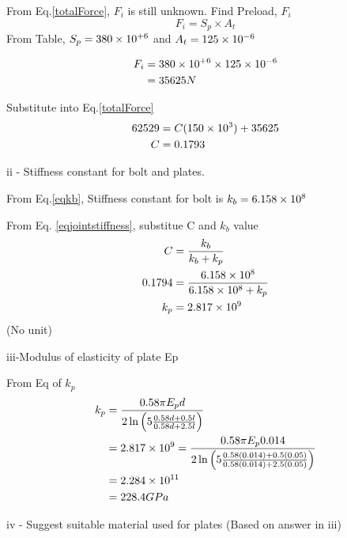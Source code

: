 \documentclass[a4paper, fleqn]{article}
\providecommand{\sci}[1]{\protect\ensuremath{\times 10^{\StrSubstitute[0]{#1}{e}{}}}}
\begin{document}
From Eq.\ref{totalForce}, $F_i$ is still unknown.
Find Preload, $F_i$
\begin{equation*}
    F_i=S_p \times A_t
\end{equation*}
From Table, $S_p=380\sci{e+6}$ and $A_t=125\sci{e-6}$

\begin{equation*}
    \begin{aligned}
    F_i&=380\sci{e+6} \times 125\sci{e-6}\\
    &=35625N 
    \end{aligned}
\end{equation*}

Substitute into Eq.\ref{totalForce}
\begin{equation*}
    \begin{aligned}
    62529 &= C(150\sci{e3})+35625 \\
    C &=0.1793
    \end{aligned}
\end{equation*}

ii - Stiffness constant for bolt and plates.


From Eq.\ref{eqkb}, Stiffness constant for bolt is $k_b=6.158\sci{e8}$

From Eq. \ref{eqjointstiffness}, substitue C and $k_b$ value
\begin{equation*}
    \begin{aligned}
    C &=\frac{k_b}{k_b+k_p}\\
    0.1794 &= \frac{6.158\sci{e8}}{6.158\sci{e8}+k_p} \\
    k_p &=2.817\sci{e9}
    \end{aligned}
\end{equation*}
(No unit)
\vspace{10pt}

iii-Modulus of elasticity of plate Ep

From Eq of $k_p$
\begin{equation}
    \begin{aligned}
        k_p &=\frac{0.58\pi E_p d}{2\ln\left( 5\frac{0.58d+0.5l}{0.58d+2.5l} \right)} \\
        &=2.817\times10^9=\frac{0.58\pi E_p 0.014}{2\ln\left( 5\frac{0.58(0.014)+0.5(0.05)}{0.58(0.014)+2.5(0.05)} \right)}\\
        &=2.284\sci{e11}\\
        &=228.4GPa
    \end{aligned}
\end{equation}


iv - Suggest suitable material used for plates (Based on answer in iii)
\end{document}
